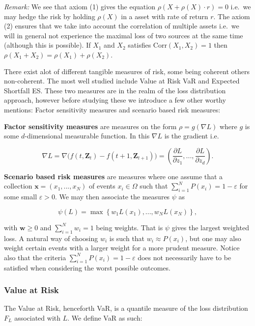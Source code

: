 \documentclass[a4paper,12pt,openany]{book}
\begin{document}
\emph{Remark:} We see that axiom (1) gives the equation \(\rho(X+\rho(X)\cdot r)=0\) i.e.~we may hedge the risk by holding \(\rho(X)\) in a asset with rate of return \(r\). The axiom (2) ensures that we take into account the correlation of multiple assets i.e.~we will in general not experience the maximal loss of two sources at the same time (although this is possible). If \(X_1\) and \(X_2\) satisfies \(\text{Corr}(X_1,X_2)=1\) then \(\rho(X_1+X_2)= \rho(X_1)+\rho(X_2)\).

There exist alot of different tangible measures of risk, some being coherent others non-coherent. The most well studied include Value at Risk VaR and Expected Shortfall ES. These two measures are in the realm of the loss distribution approach, however before studying these we introduce a few other worthy mentions: Factor sensitivity measures and scenario based risk measures:

\textbf{Factor sensitivity measures} are measures on the form \(\rho=g(\nabla L)\) where \(g\) is some \(d\)-dimensional measurable function. In this \(\nabla L\) is the gradient i.e.

\[
\nabla L=\nabla \Big(f(t,\mathbf{Z}_t)-f(t+1,\mathbf{Z}_{t+1})\Big)=\left(\frac{\partial L}{\partial z_1},...,\frac{\partial L}{\partial z_d}\right).
\]

\textbf{Scenario based risk measures} are measures where one assume that a collection \(\mathbf{x}=(x_1,...,x_N)\) of events \(x_i\in \Omega\) such that \(\sum_{i=1}^N P(x_i)=1-\varepsilon\) for some small \(\varepsilon>0\). We may then associate the measures \(\psi\) as

\[
\psi(L)=\max\left\{w_1L(x_1),...,w_NL(x_N)\right\},
\]

with \(\mathbf{w}\ge 0\) and \(\sum_{i=1}^Nw_i=1\) being weights. That is \(\psi\) gives the largest weighted loss. A natural way of choosing \(w_i\) is such that \(w_i\approx P(x_i)\), but one may also weight certain events with a larger weight for a more prudent measure. Notice also that the criteria \(\sum_{i=1}^N P(x_i)=1-\varepsilon\) does not necessarily have to be satisfied when considering the worst possible outcomes.

\hypertarget{value-at-risk}{%
\subsubsection{Value at Risk}\label{value-at-risk}}

The Value at Risk, henceforth VaR, is a quantile measure of the loss distribution \(F_L\) associated with \(L\). We define VaR as such:
\end{document}
